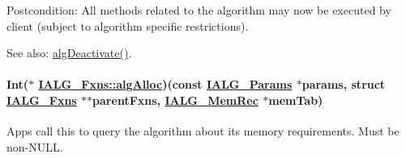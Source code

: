 \begin{Desc}
\item[Postcondition:]All methods related to the algorithm may now be executed by client (subject to algorithm specific restrictions).\end{Desc}
\begin{Desc}
\item[See also:]\hyperlink{struct_i_a_l_g___fxns_10f29860ab8b3beab69b0f0128c3d969}{alg\-Deactivate()}. \end{Desc}
\hypertarget{struct_i_a_l_g___fxns_1640ba8f4033af1ce3887283c7a12746}{
\paragraph[algAlloc]{\setlength{\rightskip}{0pt plus 5cm}Int($\ast$ \hyperlink{struct_i_a_l_g___fxns_1640ba8f4033af1ce3887283c7a12746}{IALG\_\-Fxns::alg\-Alloc})(const \hyperlink{struct_i_a_l_g___params}{IALG\_\-Params} $\ast$params, struct \hyperlink{struct_i_a_l_g___fxns}{IALG\_\-Fxns} $\ast$$\ast$parent\-Fxns, \hyperlink{struct_i_a_l_g___mem_rec}{IALG\_\-Mem\-Rec} $\ast$mem\-Tab)}\hfill}
\label{struct_i_a_l_g___fxns_1640ba8f4033af1ce3887283c7a12746}


Apps call this to query the algorithm about its memory requirements. Must be non-NULL. 

